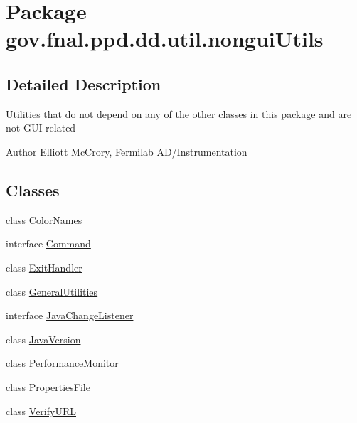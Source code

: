 \hypertarget{namespacegov_1_1fnal_1_1ppd_1_1dd_1_1util_1_1nonguiUtils}{\section{Package gov.\-fnal.\-ppd.\-dd.\-util.\-nongui\-Utils}
\label{namespacegov_1_1fnal_1_1ppd_1_1dd_1_1util_1_1nonguiUtils}
}


\subsection{Detailed Description}
Utilities that do not depend on any of the other classes in this package and are not G\-U\-I related

\begin{DoxyAuthor}{Author}
Elliott Mc\-Crory, Fermilab A\-D/\-Instrumentation 
\end{DoxyAuthor}
\subsection*{Classes}
\begin{DoxyCompactItemize}
\item 
class \hyperlink{classgov_1_1fnal_1_1ppd_1_1dd_1_1util_1_1nonguiUtils_1_1ColorNames}{Color\-Names}
\item 
interface \hyperlink{interfacegov_1_1fnal_1_1ppd_1_1dd_1_1util_1_1nonguiUtils_1_1Command}{Command}
\item 
class \hyperlink{classgov_1_1fnal_1_1ppd_1_1dd_1_1util_1_1nonguiUtils_1_1ExitHandler}{Exit\-Handler}
\item 
class \hyperlink{classgov_1_1fnal_1_1ppd_1_1dd_1_1util_1_1nonguiUtils_1_1GeneralUtilities}{General\-Utilities}
\item 
interface \hyperlink{interfacegov_1_1fnal_1_1ppd_1_1dd_1_1util_1_1nonguiUtils_1_1JavaChangeListener}{Java\-Change\-Listener}
\item 
class \hyperlink{classgov_1_1fnal_1_1ppd_1_1dd_1_1util_1_1nonguiUtils_1_1JavaVersion}{Java\-Version}
\item 
class \hyperlink{classgov_1_1fnal_1_1ppd_1_1dd_1_1util_1_1nonguiUtils_1_1PerformanceMonitor}{Performance\-Monitor}
\item 
class \hyperlink{classgov_1_1fnal_1_1ppd_1_1dd_1_1util_1_1nonguiUtils_1_1PropertiesFile}{Properties\-File}
\item 
class \hyperlink{classgov_1_1fnal_1_1ppd_1_1dd_1_1util_1_1nonguiUtils_1_1VerifyURL}{Verify\-U\-R\-L}
\end{DoxyCompactItemize}

